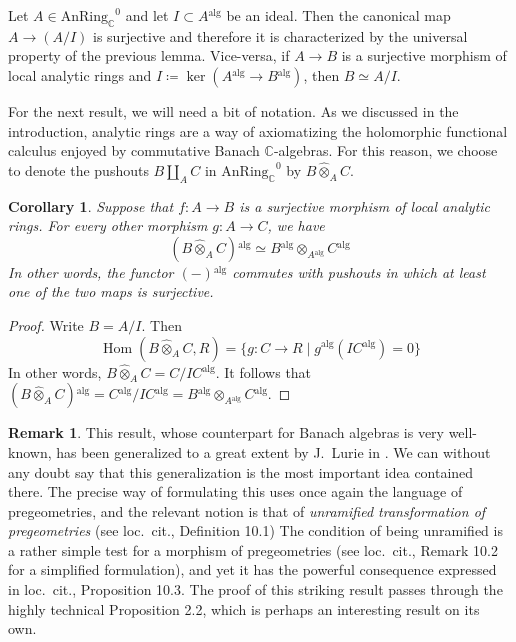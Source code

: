 \documentclass[12pt,a4paper,reqno]{amsart}
\theoremstyle{plain}
\newtheorem{cor}[thm]{Corollary}
\theoremstyle{definition}
\newtheorem{rem}[thm]{Remark}
\theoremstyle{remark}
\numberwithin{equation}{section}
\begin{document}
Let $A \in {\mathrm{AnRing}_{\mathbb C}}^0$ and let $I \subset A{^\mathrm{alg}}$ be an ideal.
Then the canonical map $A \to (A / I)$ is surjective and therefore it is characterized by the universal property of the previous lemma.
Vice-versa, if $A \to B$ is a surjective morphism of local analytic rings and $I \coloneqq \ker(A{^\mathrm{alg}} \to B{^\mathrm{alg}})$, then $B \simeq A / I$.

For the next result, we will need a bit of notation.
As we discussed in the introduction, analytic rings are a way of axiomatizing the holomorphic functional calculus enjoyed by commutative Banach $\mathbb C$-algebras.
For this reason, we choose to denote the pushouts $B \coprod_A C$ in ${\mathrm{AnRing}_{\mathbb C}}^0$ by $B {\widehat{\otimes}}_A C$.

\begin{cor} \label{cor:discrete_alg_surjective}
	Suppose that $f \colon A \to B$ is a surjective morphism of local analytic rings.
	For every other morphism $g \colon A \to C$, we have
	\[ (B {\widehat{\otimes}}_A C){^\mathrm{alg}} \simeq B{^\mathrm{alg}} \otimes_{A{^\mathrm{alg}}} C{^\mathrm{alg}} \]
	In other words, the functor $(-){^\mathrm{alg}}$ commutes with pushouts in which at least one of the two maps is surjective.
\end{cor}

\begin{proof}
	Write $B = A / I$.
	Then
	\[ \operatorname{Hom}(B {\widehat{\otimes}}_A C, R) = \{g \colon C \to R \mid g{^\mathrm{alg}}(I C{^\mathrm{alg}}) = 0\} \]
	In other words, $B {\widehat{\otimes}}_A C = C / IC{^\mathrm{alg}}$.
	It follows that $(B {\widehat{\otimes}}_A C){^\mathrm{alg}} = C{^\mathrm{alg}} / IC{^\mathrm{alg}} = B{^\mathrm{alg}} \otimes_{A{^\mathrm{alg}}} C{^\mathrm{alg}}$.
\end{proof}

\begin{rem}
	This result, whose counterpart for Banach algebras is very well-known, has been generalized to a great extent by J.\ Lurie in \cite{DAG-IX}.
	We can without any doubt say that this generalization is the most important idea contained there.
	The precise way of formulating this uses once again the language of pregeometries, and the relevant notion is that of \emph{unramified transformation of pregeometries} (see loc.\ cit., Definition 10.1) The condition of being unramified is a rather simple test for a morphism of pregeometries (see loc.\ cit., Remark 10.2 for a simplified formulation), and yet it has the powerful consequence expressed in loc.\ cit., Proposition 10.3.
	The proof of this striking result passes through the highly technical Proposition 2.2, which is perhaps an interesting result on its own.
\end{rem}
\end{document}
